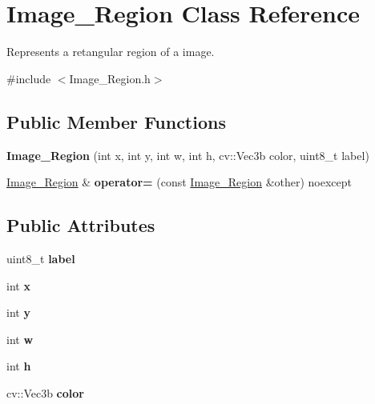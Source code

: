 \hypertarget{class_image___region}{}\section{Image\+\_\+\+Region Class Reference}
\label{class_image___region}


Represents a retangular region of a image.  




{\ttfamily \#include $<$Image\+\_\+\+Region.\+h$>$}

\subsection*{Public Member Functions}
\begin{DoxyCompactItemize}
\item 
\mbox{\label{class_image___region_acfa8590a17786a8b6ff04ea5cf1b3dd1}} 
{\bfseries Image\+\_\+\+Region} (int x, int y, int w, int h, cv\+::\+Vec3b color, uint8\+\_\+t label)
\item 
\mbox{\label{class_image___region_a54465aabcf883b2171ee5d355824daae}} 
\hyperlink{class_image___region}{Image\+\_\+\+Region} \& {\bfseries operator=} (const \hyperlink{class_image___region}{Image\+\_\+\+Region} \&other) noexcept
\end{DoxyCompactItemize}
\subsection*{Public Attributes}
\begin{DoxyCompactItemize}
\item 
\mbox{\label{class_image___region_a7da9a814613982ab09e8669365dcddf5}} 
uint8\+\_\+t {\bfseries label}
\item 
\mbox{\label{class_image___region_adfa7c16d6c220525cdd318cd46344b78}} 
int {\bfseries x}
\item 
\mbox{\label{class_image___region_a29ebec3e8faadd7b70dc5852e7410af5}} 
int {\bfseries y}
\item 
\mbox{\label{class_image___region_a13f35f1c9a4c293ba5918bea113d5a9a}} 
int {\bfseries w}
\item 
\mbox{\label{class_image___region_a6ae3e586c2832f783f310a6773e3efab}} 
int {\bfseries h}
\item 
\mbox{\label{class_image___region_a8465a5c7ed9e5f9ce33e3aa2d5331592}} 
cv\+::\+Vec3b {\bfseries color}
\end{DoxyCompactItemize}


